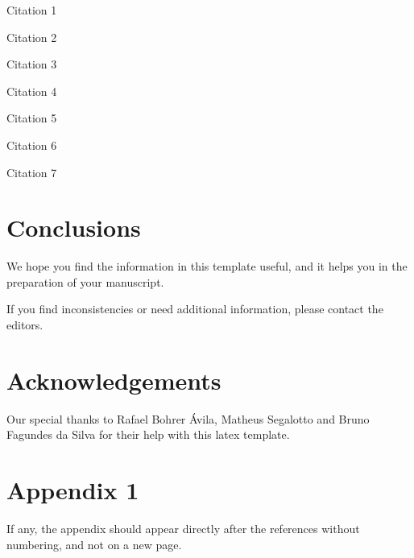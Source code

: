 \documentclass[english, spanish, brazilian]{RBIEarticle} %
\begin{document}
Citation 1 \parencite{Baker2011}

Citation 2 \parencite{Seffrin2013}

Citation 3 \parencite{Brasil2008}

Citation 4 \parencite{Kautzman2015}

Citation 5 \parencite{Sweller1991}

Citation 6 \parencite{Clark2006}

Citation 7 \parencite{Mason2012}


\section{Conclusions}
We hope you find the information in this template useful, and it helps you in the preparation of your manuscript.

If you find inconsistencies or need additional information, please contact the editors.


\section*{Acknowledgements}
Our special thanks to Rafael Bohrer Ávila, Matheus Segalotto and Bruno Fagundes da Silva for their help with this latex template. 



\printbibliography


 \section*{Appendix 1}
\label{apendice1}

If any, the appendix should appear directly after the references without numbering, and not on a new page.
\end{document}
